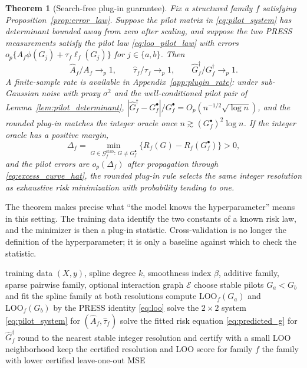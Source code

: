 \documentclass{article}
\newcommand{\KORE}{\textsc{KORE}}
\newcommand{\add}{\mathrm{add}}
\newcommand{\pair}{\mathrm{pair}}
\newcommand{\LoO}{\mathrm{LOO}}
\newtheorem{theorem}{Theorem}
\begin{document}
\begin{theorem}[Search-free plug-in guarantee]
\label{thm:plugin_guarantee}
Fix a structured family $f$ satisfying Proposition~\ref{prop:error_law}. Suppose the pilot matrix in \eqref{eq:pilot_system} has determinant bounded away from zero after scaling, and suppose the two PRESS measurements satisfy the pilot law \eqref{eq:loo_pilot_law} with errors $o_p\{A_f\phi(G_j)+\tau_f\ell_f(G_j)\}$ for $j\in\{a,b\}$. Then
\begin{equation}
    \widehat A_f/A_f \to_p 1,
    \qquad
    \widehat\tau_f/\tau_f \to_p 1,
    \qquad
    \widehat G_f^\dagger/G_f^\dagger \to_p 1.
\end{equation}
A finite-sample rate is available in Appendix~\ref{app:plugin_rate}: under sub-Gaussian noise with proxy $\sigma^2$ and the well-conditioned pilot pair of Lemma~\ref{lem:pilot_determinant}, $|\widehat G_f^\dagger - G_f^\bullet|/G_f^\bullet = O_p(n^{-1/2}\sqrt{\log n})$, and the rounded plug-in matches the integer oracle once $n \gtrsim (G_f^\bullet)^2 \log n$.
If the integer oracle has a positive margin,
\[
    \Delta_f=\min_{G\in\mathcal{G}_f^{\mathrm{stab}}:\,G\ne G_f^\bullet}
    \{R_f(G)-R_f(G_f^\bullet)\}>0,
\]
and the pilot errors are $o_p(\Delta_f)$ after propagation through \eqref{eq:excess_curve_hat}, the rounded plug-in rule selects the same integer resolution as exhaustive risk minimization with probability tending to one.
\end{theorem}

The theorem makes precise what ``the model knows the hyperparameter'' means in this setting. The training data identify the two constants of a known risk law, and the minimizer is then a plug-in statistic. Cross-validation is no longer the definition of the hyperparameter; it is only a baseline against which to check the statistic.

\begin{algorithm}[H]
\caption{\KORE{} for additive versus sparse pairwise spline selection}
\label{alg:kore}
\small
\begin{algorithmic}[1]
\Require training data $(X,y)$, spline degree $k$, smoothness index $\beta$, additive family, sparse pairwise family, optional interaction graph $\mathcal{E}$
\For{$f\in\{\add,\pair\}$}
    \State choose stable pilots $G_a<G_b$ and fit the spline family at both resolutions
    \State compute $\LoO_f(G_a)$ and $\LoO_f(G_b)$ by the PRESS identity \eqref{eq:loo}
    \State solve the $2\times2$ system \eqref{eq:pilot_system} for $(\widehat A_f,\widehat\tau_f)$
    \State solve the fitted risk equation \eqref{eq:predicted_g} for $\widehat G_f^\dagger$
    \State round to the nearest stable integer resolution and certify with a small LOO neighborhood
    \State keep the certified resolution and LOO score for family $f$
\EndFor
\State \Return the family with lower certified leave-one-out MSE
\end{algorithmic}
\end{algorithm}
\end{document}
